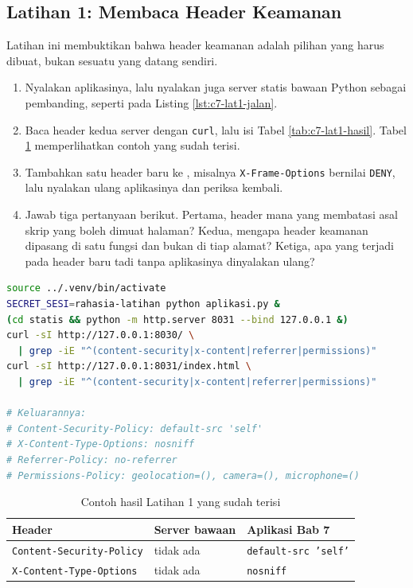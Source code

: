 \subsection*{Latihan 1: Membaca Header Keamanan}

Latihan ini membuktikan bahwa header keamanan adalah pilihan yang harus
dibuat, bukan sesuatu yang datang sendiri.

\begin{enumerate}
  \item Nyalakan aplikasinya, lalu nyalakan juga server statis bawaan Python
        sebagai pembanding, seperti pada Listing \ref{lst:c7-lat1-jalan}.
  \item Baca header kedua server dengan \texttt{curl}, lalu isi Tabel \ref{tab:c7-lat1-hasil}. Tabel \ref{tab:c7-lat1-contoh}
        memperlihatkan contoh yang sudah terisi.
  \item Tambahkan satu header baru ke ,
        misalnya \texttt{X-Frame-Options} bernilai \texttt{DENY}, lalu
        nyalakan ulang aplikasinya dan periksa kembali.
  \item Jawab tiga pertanyaan berikut. Pertama, header mana yang membatasi
        asal skrip yang boleh dimuat halaman? Kedua, mengapa header keamanan
        dipasang di satu fungsi dan bukan di tiap alamat? Ketiga, apa yang
        terjadi pada header baru tadi tanpa aplikasinya dinyalakan ulang?
\end{enumerate}

\begin{lstlisting}[language=bash, caption={Membaca header dua server, tersedia di \berkas{sources/chapter07/aplikasi.py}}, label={lst:c7-lat1-jalan}]
source ../.venv/bin/activate
SECRET_SESI=rahasia-latihan python aplikasi.py &
(cd statis && python -m http.server 8031 --bind 127.0.0.1 &)
curl -sI http://127.0.0.1:8030/ \
  | grep -iE "^(content-security|x-content|referrer|permissions)"
curl -sI http://127.0.0.1:8031/index.html \
  | grep -iE "^(content-security|x-content|referrer|permissions)"

# Keluarannya:
# Content-Security-Policy: default-src 'self'
# X-Content-Type-Options: nosniff
# Referrer-Policy: no-referrer
# Permissions-Policy: geolocation=(), camera=(), microphone=()
\end{lstlisting}

\begin{table}[!htb]
  \centering
  \caption{Contoh hasil Latihan 1 yang sudah terisi}
  \label{tab:c7-lat1-contoh}
  \begin{tabularx}{\textwidth}{Xll}
    \hline
    \textbf{Header} & \textbf{Server bawaan} & \textbf{Aplikasi Bab 7} \\
    \hline
    \texttt{Content-Security-}\newline\texttt{Policy} & tidak ada & \texttt{default-src 'self'} \\
    \hline
    \texttt{X-Content-Type-}\newline\texttt{Options} & tidak ada & \texttt{nosniff} \\
    \hline
  \end{tabularx}
\end{table}


